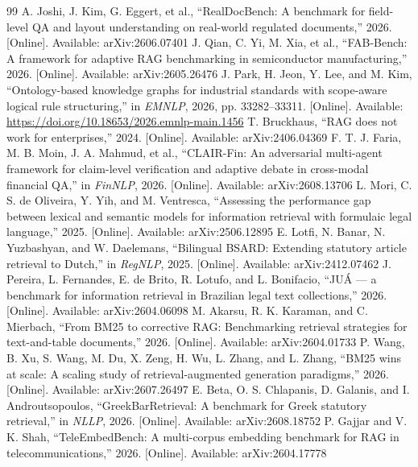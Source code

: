 \documentclass[preprint,3p,times]{elsarticle}
\begin{document}
\begin{thebibliography}{99}
 A. Joshi, J. Kim, G. Eggert, et al., ``RealDocBench: A benchmark for field-level QA and layout understanding on real-world regulated documents,'' 2026. [Online]. Available: arXiv:2606.07401
 J. Qian, C. Yi, M. Xia, et al., ``FAB-Bench: A framework for adaptive RAG benchmarking in semiconductor manufacturing,'' 2026. [Online]. Available: arXiv:2605.26476
 J. Park, H. Jeon, Y. Lee, and M. Kim, ``Ontology-based knowledge graphs for industrial standards with scope-aware logical rule structuring,'' in \emph{EMNLP}, 2026, pp. 33282--33311. [Online]. Available: \url{https://doi.org/10.18653/2026.emnlp-main.1456}
 T. Bruckhaus, ``RAG does not work for enterprises,'' 2024. [Online]. Available: arXiv:2406.04369
 F. T. J. Faria, M. B. Moin, J. A. Mahmud, et al., ``CLAIR-Fin: An adversarial multi-agent framework for claim-level verification and adaptive debate in cross-modal financial QA,'' in \emph{FinNLP}, 2026. [Online]. Available: arXiv:2608.13706
 L. Mori, C. S. de Oliveira, Y. Yih, and M. Ventresca, ``Assessing the performance gap between lexical and semantic models for information retrieval with formulaic legal language,'' 2025. [Online]. Available: arXiv:2506.12895
 E. Lotfi, N. Banar, N. Yuzbashyan, and W. Daelemans, ``Bilingual BSARD: Extending statutory article retrieval to Dutch,'' in \emph{RegNLP}, 2025. [Online]. Available: arXiv:2412.07462
 J. Pereira, L. Fernandes, E. de Brito, R. Lotufo, and L. Bonifacio, ``JU\'A --- a benchmark for information retrieval in Brazilian legal text collections,'' 2026. [Online]. Available: arXiv:2604.06098
 M. Akarsu, R. K. Karaman, and C. Mierbach, ``From BM25 to corrective RAG: Benchmarking retrieval strategies for text-and-table documents,'' 2026. [Online]. Available: arXiv:2604.01733
 P. Wang, B. Xu, S. Wang, M. Du, X. Zeng, H. Wu, L. Zhang, and L. Zhang, ``BM25 wins at scale: A scaling study of retrieval-augmented generation paradigms,'' 2026. [Online]. Available: arXiv:2607.26497
 E. Beta, O. S. Chlapanis, D. Galanis, and I. Androutsopoulos, ``GreekBarRetrieval: A benchmark for Greek statutory retrieval,'' in \emph{NLLP}, 2026. [Online]. Available: arXiv:2608.18752
 P. Gajjar and V. K. Shah, ``TeleEmbedBench: A multi-corpus embedding benchmark for RAG in telecommunications,'' 2026. [Online]. Available: arXiv:2604.17778

\end{thebibliography}
\end{document}
